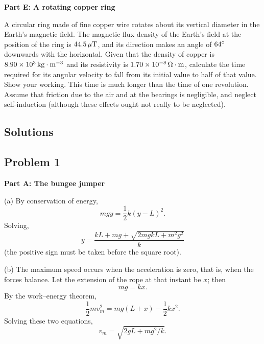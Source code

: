 \textbf{Part E: A rotating copper ring}

A circular ring made of fine copper wire rotates about its vertical diameter in the Earth's magnetic field. The magnetic flux density of the Earth's field at the position of the ring is $44.5\,\mathrm{\mu T}$, and its direction makes an angle of $64^{\circ}$ downwards with the horizontal. Given that the density of copper is $8.90\times10^3\,\mathrm{kg\cdot m^{-3}}$ and its resistivity is $1.70\times10^{-8}\,\mathrm{\Omega\cdot m}$, calculate the time required for its angular velocity to fall from its initial value to half of that value. Show your working. This time is much longer than the time of one revolution. Assume that friction due to the air and at the bearings is negligible, and neglect self-induction (although these effects ought not really to be neglected).

\subsection*{Solutions}

\subsection*{Problem 1}

\textbf{Part A: The bungee jumper}

(a) By conservation of energy,
\begin{equation*}
mgy=\frac{1}{2}k(y-L)^2 .
\end{equation*}
Solving,
\begin{equation*}
y=\frac{kL+mg+\sqrt{2mgkL+m^2g^2}}{k}
\end{equation*}
(the positive sign must be taken before the square root).

(b) The maximum speed occurs when the acceleration is zero, that is, when the forces balance. Let the extension of the rope at that instant be $x$; then
\begin{equation*}
mg=kx .
\end{equation*}
By the work--energy theorem,
\begin{equation*}
\frac{1}{2}mv_m^2=mg(L+x)-\frac{1}{2}kx^2 .
\end{equation*}
Solving these two equations,
\begin{equation*}
v_m=\sqrt{2gL+mg^2/k} .
\end{equation*}

